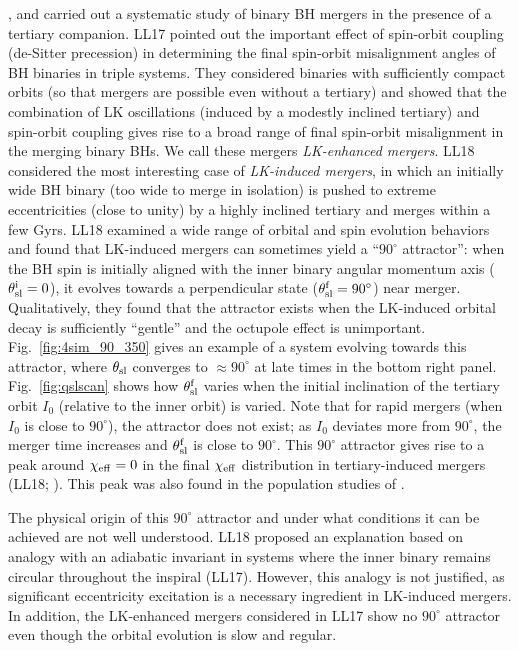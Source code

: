 \documentclass[
        twocolumn,
        twocolappendix
    ]{aastex63}
\begin{document}
\citet[][hereafter LL17, LL18]{bin1, bin2}, and \citet{bin3} carried out a
systematic study of binary BH mergers in the presence of a tertiary companion.
LL17 pointed out the important effect of spin-orbit coupling (de-Sitter
precession) in determining the final spin-orbit misalignment angles of BH
binaries in triple systems. They considered binaries with sufficiently compact
orbits (so that mergers are possible even without a tertiary) and showed that
the combination of LK oscillations (induced by a modestly inclined tertiary) and
spin-orbit coupling gives rise to a broad range of final spin-orbit misalignment
in the merging binary BHs. We call these mergers \emph{LK-enhanced mergers}.
LL18 considered the most interesting case of \emph{ LK-induced mergers}, in
which an initially wide BH binary (too wide to merge in isolation) is pushed
to extreme eccentricities (close to unity) by a highly inclined tertiary and
merges within a few Gyrs. LL18 examined a wide range of orbital and spin
evolution behaviors and found that LK-induced mergers can sometimes yield a
``$90^\circ$ attractor'': when the BH spin is initially aligned with the inner
binary angular momentum axis ($\theta_{\rm sl}^{\rm i} = 0$), it evolves towards
a perpendicular state ($\theta_{\rm sl}^{\rm f} = 90^\circ$) near merger.
Qualitatively, they found that the attractor exists when the LK-induced orbital
decay is sufficiently ``gentle'' and the octupole effect is unimportant.
Fig.~\ref{fig:4sim_90_350} gives an example of a system evolving towards this
attractor, where $\theta_{\rm sl}$ converges to $\approx 90^\circ$ at
late times in the bottom right panel. Fig.~\ref{fig:qslscan} shows how
$\theta_{\rm sl}^{\rm f}$ varies when the initial inclination of the tertiary
orbit $I_0$ (relative to the inner orbit) is varied. Note that for rapid mergers
(when $I_0$ is close to $90^\circ$), the attractor does not exist; as $I_0$
deviates more from $90^\circ$, the merger time increases and $\theta_{\rm
sl}^{\rm f}$ is close to $90^\circ$.  This $90^\circ$ attractor gives rise to a
peak around $\chi_{\rm eff} = 0$ in the final $\chi_{\rm eff}$ distribution in
tertiary-induced mergers (LL18; \citealp{bin3}). This peak was also found in the
population studies of \citet{antonini2018precessional}.

The physical origin of this $90^\circ$ attractor and under what conditions it
can be achieved are not well understood. LL18 proposed an explanation based on
analogy with an adiabatic invariant in systems where the inner binary remains
circular throughout the inspiral (LL17). However, this analogy is not justified,
as significant eccentricity excitation is a necessary ingredient in LK-induced
mergers. In addition, the LK-enhanced mergers considered in LL17 show no
$90^\circ$ attractor even though the orbital evolution is slow and regular.
\end{document}
